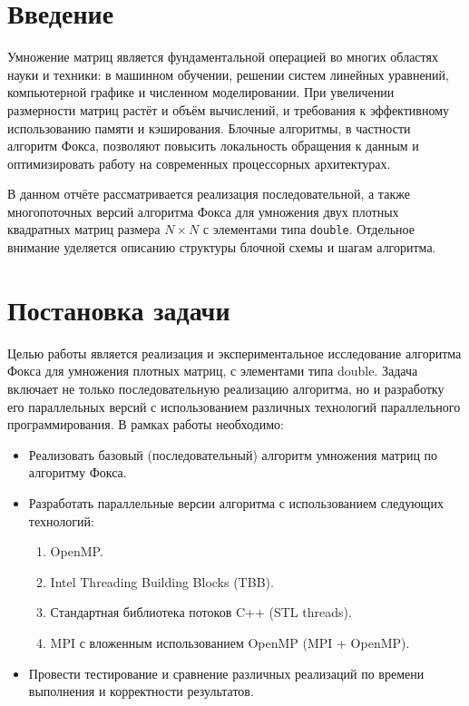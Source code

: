 \documentclass[14pt,a4paper]{extarticle}
\begin{document}
\section{Введение}
Умножение матриц является фундаментальной операцией во многих областях науки и техники: в машинном обучении, решении систем линейных уравнений, компьютерной графике и численном моделировании. При увеличении размерности матриц растёт и объём вычислений, и требования к эффективному использованию памяти и кэширования. Блочные алгоритмы, в частности алгоритм Фокса, позволяют повысить локальность обращения к данным и оптимизировать работу на современных процессорных архитектурах.

В данном отчёте рассматривается реализация последовательной, а также многопоточных версий алгоритма Фокса для умножения двух плотных квадратных матриц размера $N\times N$ с элементами типа \texttt{double}. Отдельное внимание уделяется описанию структуры блочной схемы и шагам алгоритма.
\newpage

\section{Постановка задачи}
Целью работы является реализация и экспериментальное исследование алгоритма Фокса для умножения плотных матриц, с элементами типа double. Задача включает не только последовательную реализацию алгоритма, но и разработку его параллельных версий с использованием различных технологий параллельного программирования. В рамках работы необходимо:

\begin{itemize}
    \item Реализовать базовый (последовательный) алгоритм умножения матриц по алгоритму Фокса.
    \item Разработать параллельные версии алгоритма с использованием следующих технологий:
    \begin{enumerate}
        \item OpenMP.
        \item Intel Threading Building Blocks (TBB).
        \item Стандартная библиотека потоков C++ (STL threads).
        \item MPI с вложенным использованием OpenMP (MPI + OpenMP).
    \end{enumerate}
    \item Провести тестирование и сравнение различных реализаций по времени выполнения и корректности результатов.
\end{itemize}
\end{document}
